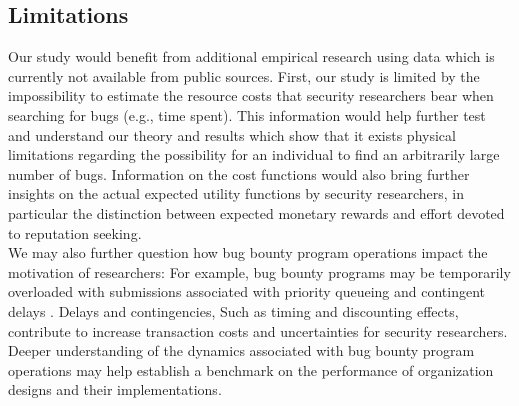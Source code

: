 

\subsection{Limitations}
Our study would benefit from additional empirical research using data which is currently not available from public sources. First, our study is limited by the impossibility to estimate the resource costs that security researchers bear when searching for bugs (e.g., time spent). This information would help further test and understand our theory and results which show that it exists physical limitations regarding the possibility for an individual to find an arbitrarily large number of bugs. Information on the cost functions would also bring further insights on the actual expected utility functions by security researchers, in particular the distinction between expected monetary rewards and effort devoted to reputation seeking.\\

We may also further question how bug bounty program operations impact the motivation of researchers: For example, bug bounty programs may be temporarily overloaded with submissions \cite{zhao2014exploratory,zhao2015empirical} associated with priority queueing and contingent delays \cite{maillart2011quantification}. Delays and contingencies, Such as timing and discounting effects, contribute to increase transaction costs and uncertainties for security researchers. Deeper understanding of the dynamics associated with bug bounty program operations may help establish a benchmark on the performance of organization designs and their implementations.\\

